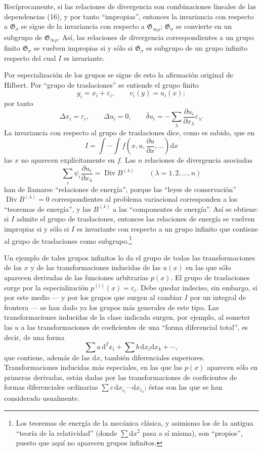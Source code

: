 \documentclass[11pt]{article}
\newcommand{\D}{\Delta}
\newcommand{\eps}{\varepsilon}
\providecommand{\dd}{\mathrm d}
\providecommand{\Div}{\operatorname{Div}}
\providecommand{\G}{\mathfrak G}
\providecommand{\bd}{\bar{\delta}}
\providecommand{\p}{\partial}
\begin{document}
Recíprocamente, si las relaciones de divergencia son combinaciones lineales de las dependencias (16), y por tanto ``impropias'', entonces la invariancia con respecto a \(\G_\sigma\) se sigue de la invariancia con respecto a \(\G_{\infty\rho}\); \(\G_\sigma\) se convierte en un subgrupo de \(\G_{\infty\rho}\). Así, las relaciones de divergencia correspondientes a un grupo finito \(\G_\sigma\) se vuelven impropias si y sólo si \(\G_\sigma\) es subgrupo de un grupo infinito respecto del cual \(I\) es invariante.

Por especialización de los grupos se sigue de esto la afirmación original de Hilbert. Por ``grupo de traslaciones'' se entiende el grupo finito
\[
y_i=x_i+\eps_i,\qquad v_i(y)=u_i(x);
\]
por tanto
\[
\D x_i=\eps_i,\qquad \D u_i=0,\qquad
\bd u_i=-\sum_\lambda\frac{\p u_i}{\p x_\lambda}\eps_\lambda.
\]
La invariancia con respecto al grupo de traslaciones dice, como es sabido, que en
\[
I=\int\!\cdots\!\int f\!\left(x,u,\frac{\p u}{\p x},\ldots\right)\dd x
\]
las \(x\) no aparecen explícitamente en \(f\). Las \(n\) relaciones de divergencia asociadas
\[
\sum_i\psi_i\frac{\p u_i}{\p x_\lambda}=\Div B^{(\lambda)}
\qquad(\lambda=1,2,\ldots,n)
\]
han de llamarse ``relaciones de energía'', porque las ``leyes de conservación'' \(\Div B^{(\lambda)}=0\) correspondientes al problema variacional corresponden a los ``teoremas de energía'', y las \(B^{(\lambda)}\) a las ``componentes de energía''. Así se obtiene: si \(I\) admite el grupo de traslaciones, entonces las relaciones de energía se vuelven impropias si y sólo si \(I\) es invariante con respecto a un grupo infinito que contiene al grupo de traslaciones como subgrupo.\footnote{Los teoremas de energía de la mecánica clásica, y asimismo los de la antigua ``teoría de la relatividad'' (donde \(\sum \dd x^2\) pasa a sí misma), son ``propios'', puesto que aquí no aparecen grupos infinitos.}

Un ejemplo de tales grupos infinitos lo da el grupo de todas las transformaciones de las \(x\) y de las transformaciones inducidas de las \(u(x)\) en las que sólo aparecen derivadas de las funciones arbitrarias \(p(x)\). El grupo de traslaciones surge por la especialización \(p^{(i)}(x)=\eps_i\). Debe quedar indeciso, sin embargo, si por este medio --- y por los grupos que surgen al cambiar \(I\) por un integral de frontera --- se han dado ya los grupos más generales de este tipo. Las transformaciones inducidas de la clase indicada surgen, por ejemplo, al someter las \(u\) a las transformaciones de coeficientes de una ``forma diferencial total'', es decir, de una forma
\[
\sum a\,\dd^2x_i+\sum b\,\dd x_i\dd x_k+\cdots,
\]
que contiene, además de las \(\dd x\), también diferenciales superiores. Transformaciones inducidas más especiales, en las que las \(p(x)\) aparecen sólo en primeras derivadas, están dadas por las transformaciones de coeficientes de formas diferenciales ordinarias \(\sum c\,\dd x_{i_1}\cdots \dd x_{i_\lambda}\); éstas son las que se han considerado usualmente.
\end{document}
